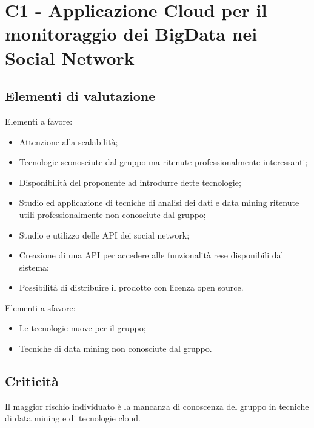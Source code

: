 \section{C1 - Applicazione Cloud per il monitoraggio dei BigData nei Social Network}{
	\subsection{Elementi di valutazione}{
		Elementi a favore:
		\begin{itemize}
			\item Attenzione alla scalabilità;
			\item Tecnologie sconosciute dal gruppo ma ritenute professionalmente interessanti;
			\item Disponibilità del proponente ad introdurre dette tecnologie;
			\item Studio ed applicazione di tecniche di analisi dei dati e data mining ritenute utili professionalmente non conosciute dal gruppo;
			\item Studio e utilizzo delle API dei social network;
			\item Creazione di una API per accedere alle funzionalità rese disponibili dal sistema;
			\item Possibilità di distribuire il prodotto con licenza open source.
		\end{itemize}
		
		Elementi a sfavore:
		\begin{itemize}
			\item Le tecnologie nuove per il gruppo;
			\item Tecniche di data mining non conosciute dal gruppo.
		\end{itemize}
	}
	\subsection{Criticità}{
		Il maggior rischio individuato è la mancanza di conoscenza del gruppo in tecniche di data mining e di tecnologie cloud.
	}
}
